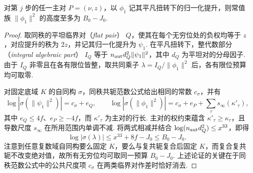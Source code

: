 \begin{lemma}[主对的平凡扭转提升范数]
\label{lem:c-untwisted-main-pair}
\emitthmsource
对第 $j$ 步的任一主对 $P=(\nu,z)$，以 $\phi_1$ 记其平凡扭转下的归一化提升，则常值族 $\|\phi_1\|^2$ 的高度至多为 $B_0-J_0$.
\end{lemma}
\begin{proof}
取同秩的平坦临界对（\emph{flat pair}） $Q$，使其在每个无穷位处的负权均等于 $z$，对应提升的秩为 $2z$，并记其归一化提升为 $\psi_1$. 在平凡扭转下，整代数部分（\emph{integral algebraic part}） $I_Q$ 等于 $n_{\rm aut}d_Q^2\|\psi_1\|^2$，其中 $d_Q$ 为平坦对的分母因子. 由于 $I_Q$ 非零且在各有限位皆整，取共同乘子 $\lambda=I_Q/\|\phi_1\|^2$ 后，各有限位预算均可取零.

对固定底域 $K$ 的自同构 $\sigma$，同秩共轭范数公式给出相同的常数 $c_\sigma$，并有
\[
 \log|\sigma(\|\psi_1\|^2)|=c_\sigma+e_Q,\qquad
 \log|\sigma(\|\phi_1\|^2)|=c_\sigma+e_P+
     \sum_\tau s_\infty(\kappa'_\tau),
\]
其中 $e_Q\le4f$、$e_P\ge-4f$，而 $\kappa'_\tau$ 为主对的行长. 主对的权约束蕴含 $\kappa'_\tau\ge\kappa_\tau$，且导数尺度 $s_\infty$ 在所用范围内单调不减. 将两式相减并结合 $\log(n_{\rm aut}d_Q^2)\le x^{33}$，即得
\[
 \log|\sigma(\lambda)|\le x^{33}+8f-J_0\le B_0-J_0 .
\]
注意到任意复数域自同构要么固定 $K$，要么与复共轭复合后固定 $K$，而复合复共轭不改变绝对值，故所有无穷位均可取同一预算 $B_0-J_0$. 上述论证的关键在于同秩范数公式中的公共尺度项 $c_\sigma$ 在两类临界对作差时恰好消去.
\end{proof}

